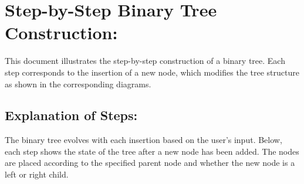 \documentclass[10pt,a4paper]{article}
\begin{document}
\section*{Step-by-Step Binary Tree Construction:}
This document illustrates the step-by-step construction of a binary tree. Each step corresponds to the insertion of a new node, which modifies the tree structure as shown in the corresponding diagrams.

\subsection*{Explanation of Steps:}
The binary tree evolves with each insertion based on the user's input. Below, each step shows the state of the tree after a new node has been added. The nodes are placed according to the specified parent node and whether the new node is a left or right child.
\end{document}
